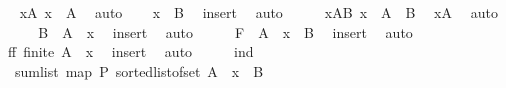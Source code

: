 \begin{isabellebody}
\ \isamarkupfalse%
\ xA{\isacharcolon}{\kern0pt}\ {\isachardoublequoteopen}x\ {\isasymin}\ A{\isachardoublequoteclose}\ \isamarkupfalse%
\ auto\isanewline
\ \ \isamarkupfalse%
\ {\isachardoublequoteopen}x\ {\isasymnotin}\ B{\isachardoublequoteclose}\ \isamarkupfalse%
\ insert\ \isamarkupfalse%
\ auto\isanewline
\ \ \isamarkupfalse%
\ \isamarkupfalse%
\ xAB{\isacharcolon}{\kern0pt}\ {\isachardoublequoteopen}x\ {\isasymin}\ {\isacharparenleft}{\kern0pt}A\ {\isacharminus}{\kern0pt}\ B{\isacharparenright}{\kern0pt}{\isachardoublequoteclose}\ \isamarkupfalse%
\ xA\ \isamarkupfalse%
\ auto\isanewline
\ \ \isamarkupfalse%
\ \isamarkupfalse%
\ {\isachardoublequoteopen}B\ {\isasymsubseteq}\ A\ {\isacharminus}{\kern0pt}\ {\isacharbraceleft}{\kern0pt}x{\isacharbraceright}{\kern0pt}{\isachardoublequoteclose}\ \isamarkupfalse%
\ insert\ \isamarkupfalse%
\ auto\isanewline
\ \ \isamarkupfalse%
\ \isamarkupfalse%
\ {\isachardoublequoteopen}F\ {\isacharequal}{\kern0pt}\ {\isacharparenleft}{\kern0pt}A\ {\isacharminus}{\kern0pt}\ {\isacharbraceleft}{\kern0pt}x{\isacharbraceright}{\kern0pt}{\isacharparenright}{\kern0pt}\ {\isacharminus}{\kern0pt}\ B{\isachardoublequoteclose}\ \isamarkupfalse%
\ insert\ \isamarkupfalse%
\ auto\isanewline
\ \ \isamarkupfalse%
\ \isamarkupfalse%
\ ff{\isacharcolon}{\kern0pt}\ {\isachardoublequoteopen}finite\ {\isacharparenleft}{\kern0pt}A\ {\isacharminus}{\kern0pt}\ {\isacharbraceleft}{\kern0pt}x{\isacharbraceright}{\kern0pt}{\isacharparenright}{\kern0pt}{\isachardoublequoteclose}\ \isamarkupfalse%
\ insert\ \isamarkupfalse%
\ auto\isanewline
\ \ \isamarkupfalse%
\ \isamarkupfalse%
\ ind{\isacharcolon}{\kern0pt}\ {\isachardoublequoteopen}\isanewline
\ \ sum{\isacharunderscore}{\kern0pt}list\ {\isacharparenleft}{\kern0pt}map\ P\ {\isacharparenleft}{\kern0pt}sorted{\isacharunderscore}{\kern0pt}list{\isacharunderscore}{\kern0pt}of{\isacharunderscore}{\kern0pt}set\ {\isacharparenleft}{\kern0pt}{\isacharparenleft}{\kern0pt}A\ {\isacharminus}{\kern0pt}\ {\isacharbraceleft}{\kern0pt}x{\isacharbraceright}{\kern0pt}{\isacharparenright}{\kern0pt}\ {\isacharminus}{\kern0pt}\ B{\isacharparenright}{\kern0pt}{\isacharparenright}{\kern0pt}{\isacharparenright}{\kern0pt}\ {\isacharequal}{\kern0pt}\isanewline

\end{isabellebody}
